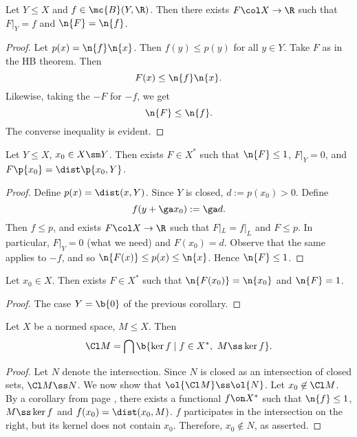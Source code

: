 \begin{corollary}
  Let $Y \le X$ and $f \in \mc{B}(Y, \R)$. Then there exists $F \col X \to \R$ such that $F|_Y = f$ and $\n{F} = \n{f}$.
\end{corollary}

\begin{proof}
  Let $p(x) = \n{f} \n{x}$. Then $f(y) \le p(y)$ for all $y \in Y$.
  Take $F$ as in the HB theorem.
  Then
  $$ F(x) \le \n{f} \n{x}. $$
  Likewise, taking the $-F$ for $-f$, we get
  $$ \n{F} \le \n{f}. $$
  The converse inequality is evident.
\end{proof}

\begin{corollary}
  \label{a point and a linear subspace can be separated}
  Let $Y \le X$, $x_0 \in X \sm Y$. Then exists $F \in X^*$ such that $\n{F} \le 1$, $F|_Y = 0$, and $F\p{x_0} = \dist\p{x_0, Y}$.
\end{corollary}

\begin{proof}
  Define $p(x) = \dist(x, Y)$.
  Since $Y$ is closed, $d := p(x_0) > 0$.
  Define
  $$ f(y+\ga x_0) := \ga d. $$
  Then $f \le p$, and exists $F \col X \to \R$ such that $F|_L = f|_L$ and $F \le p$.
  In particular, $F|_Y = 0$ (what we need) and $F(x_0) = d$.
  Observe that the same applies to $-f$, and so $\n{F(x)} \le p(x) \le \n{x}$.
  Hence $\n{F} \le 1$.
\end{proof}

\begin{corollary}
  Let $x_0 \in X$. Then exists $F \in X^*$ such that $\n{F(x_0)} = \n{x_0}$ and $\n{F} = 1$.
\end{corollary}

\begin{proof}
  The case $Y = \b{0}$ of the previous corollary.
\end{proof}

\begin{corollary}
  Let $X$ be a normed space, $M \le X$.
  Then
  $$ \Cl M = \bigcap \b{ \ker f \mid f \in X^*,\ M \ss \ker f }. $$  
\end{corollary}

\begin{proof}
  Let $N$ denote the intersection.
  Since $N$ is closed as an intersection of closed sets, $\Cl M \ss N$.
  We now show that $\ol{\Cl M} \ss \ol{N}$.
  Let $x_0 \not\in \Cl M$.
  By a corollary from page \pageref{a point and a linear subspace can be separated}, there exists a functional $f \on X^*$ such that $\n{f} \le 1$, $M \ss \ker f$ and $f(x_0) = \dist(x_0, M)$.
  $f$ participates in the intersection on the right, but its kernel does not contain $x_0$.
  Therefore, $x_0 \not\in N$, as asserted.
\end{proof}


